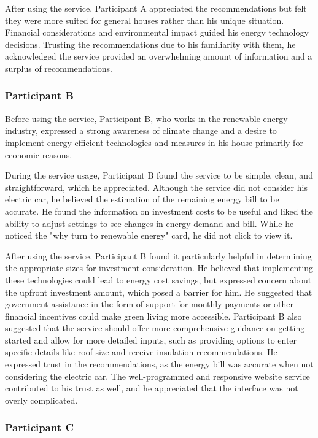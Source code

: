 After using the service, 
Participant A appreciated the recommendations but felt they were more suited for general houses rather than his unique situation. 
Financial considerations and environmental impact guided his energy technology decisions. 
Trusting the recommendations due to his familiarity with them, he acknowledged the service provided an overwhelming amount of information and a surplus of recommendations.


\subsubsection{Participant B}

Before using the service, 
Participant B, who works in the renewable energy industry, 
expressed a strong awareness of climate change and a desire to implement energy-efficient technologies and measures in his house primarily for economic reasons.

During the service usage, 
Participant B found the service to be simple, clean, and straightforward, which he appreciated. 
Although the service did not consider his electric car, he believed the estimation of the remaining energy bill to be accurate. 
He found the information on investment costs to be useful and liked the ability to adjust settings to see changes in energy demand and bill. 
While he noticed the "why turn to renewable energy" card, he did not click to view it.

After using the service, 
Participant B found it particularly helpful in determining the appropriate sizes for investment consideration. 
He believed that implementing these technologies could lead to energy cost savings, 
but expressed concern about the upfront investment amount, which posed a barrier for him. 
He suggested that government assistance in the form of support for monthly payments or other financial incentives could make green living more accessible. 
Participant B also suggested that the service should offer more comprehensive guidance on getting started 
and allow for more detailed inputs, such as providing options to enter specific details like roof size and receive insulation recommendations. 
He expressed trust in the recommendations, as the energy bill was accurate when not considering the electric car. 
The well-programmed and responsive website service contributed to his trust as well, and he appreciated that the interface was not overly complicated.


\subsubsection{Participant C}

